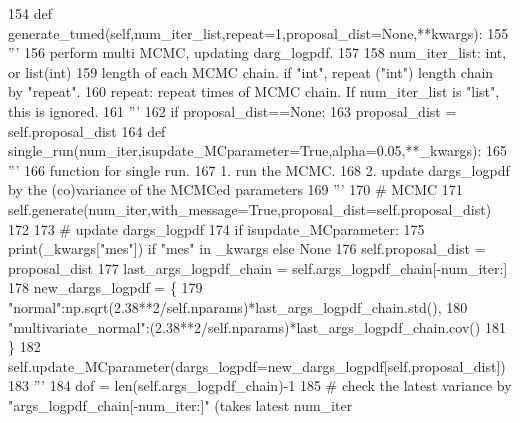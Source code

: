 \begin{DoxyCode}
154     \textcolor{keyword}{def }generate\_tuned(self,num\_iter\_list,repeat=1,proposal\_dist=None,**kwargs):
155         \textcolor{stringliteral}{'''}
156 \textcolor{stringliteral}{        perform multi MCMC, updating darg\_logpdf.}
157 \textcolor{stringliteral}{        }
158 \textcolor{stringliteral}{        num\_iter\_list: int, or list(int)}
159 \textcolor{stringliteral}{            length of each MCMC chain. if "int", repeat ("int") length chain by "repeat".}
160 \textcolor{stringliteral}{        repeat: repeat times of MCMC chain. If num\_iter\_list is "list", this is ignored.}
161 \textcolor{stringliteral}{        '''}
162         \textcolor{keywordflow}{if} proposal\_dist==\textcolor{keywordtype}{None}:
163             proposal\_dist = self.proposal\_dist
164         \textcolor{keyword}{def }single\_run(num\_iter,isupdate\_MCparameter=True,alpha=0.05,**\_kwargs):
165             \textcolor{stringliteral}{'''}
166 \textcolor{stringliteral}{            function for single run.}
167 \textcolor{stringliteral}{                1. run the MCMC.}
168 \textcolor{stringliteral}{                2. update dargs\_logpdf by the (co)variance of the MCMCed parameters}
169 \textcolor{stringliteral}{            '''}
170             \textcolor{comment}{# MCMC}
171             self.generate(num\_iter,with\_message=\textcolor{keyword}{True},proposal\_dist=self.proposal\_dist)
172             
173             \textcolor{comment}{# update dargs\_logpdf}
174             \textcolor{keywordflow}{if} isupdate\_MCparameter:
175                 print(\_kwargs[\textcolor{stringliteral}{"mes"}]) \textcolor{keywordflow}{if} \textcolor{stringliteral}{"mes"} \textcolor{keywordflow}{in} \_kwargs \textcolor{keywordflow}{else} \textcolor{keywordtype}{None}
176                 self.proposal\_dist = proposal\_dist
177                 last\_args\_logpdf\_chain = self.args\_logpdf\_chain[-num\_iter:]
178                 new\_dargs\_logpdf = \{
179                     \textcolor{stringliteral}{"normal"}:np.sqrt(2.38**2/self.nparams)*last\_args\_logpdf\_chain.std(),
180                     \textcolor{stringliteral}{"multivariate\_normal"}:(2.38**2/self.nparams)*last\_args\_logpdf\_chain.cov()
181                 \}
182                 self.update\_MCparameter(dargs\_logpdf=new\_dargs\_logpdf[self.proposal\_dist])
183                 \textcolor{stringliteral}{'''}
184 \textcolor{stringliteral}{                dof = len(self.args\_logpdf\_chain)-1}
185 \textcolor{stringliteral}{                # check the latest variance by "args\_logpdf\_chain[-num\_iter:]" (takes latest num\_iter
}
\end{DoxyCode}
